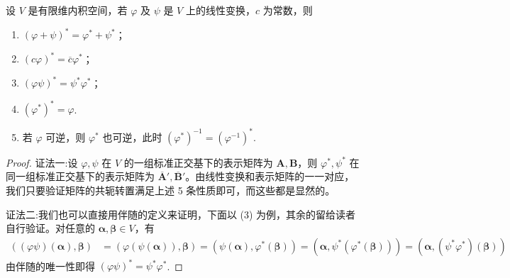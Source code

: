 \documentclass[../../main.tex]{subfiles}
\begin{document}
\begin{theorem}[伴随算子的性质]\label{theorem:伴随算子的性质}
设 $V$ 是有限维内积空间，若 $\varphi$ 及 $\psi$ 是 $V$ 上的线性变换，$c$ 为常数，则
\begin{enumerate}[(1)]
\item $(\varphi + \psi)^* = \varphi^* + \psi^*$；

\item $(c\varphi)^* = \overline{c}\varphi^*$；

\item $(\varphi\psi)^* = \psi^*\varphi^*$；

\item $(\varphi^*)^* = \varphi$.

\item 若 \(\varphi\) 可逆，则 \(\varphi^*\) 也可逆，此时 \((\varphi^*)^{-1}=(\varphi^{-1})^*\). 
\end{enumerate} 
\end{theorem}
\begin{proof}
{\color{blue}证法一:}设 $\varphi, \psi$ 在 $V$ 的一组标准正交基下的表示矩阵为 $\boldsymbol{A}, \boldsymbol{B}$，则 $\varphi^*, \psi^*$ 在同一组标准正交基下的表示矩阵为 $\overline{\boldsymbol{A}}', \overline{\boldsymbol{B}}'$。由线性变换和表示矩阵的一一对应，我们只要验证矩阵的共轭转置满足上述 5 条性质即可，而这些都是显然的。

{\color{blue}证法二:}我们也可以直接用伴随的定义来证明，下面以 (3) 为例，其余的留给读者自行验证。对任意的 $\boldsymbol{\alpha}, \boldsymbol{\beta} \in V$，有
\begin{align*}
((\varphi\psi)(\boldsymbol{\alpha}), \boldsymbol{\beta}) &= (\varphi(\psi(\boldsymbol{\alpha})), \boldsymbol{\beta}) = (\psi(\boldsymbol{\alpha}), \varphi^*(\boldsymbol{\beta})) = (\boldsymbol{\alpha}, \psi^*(\varphi^*(\boldsymbol{\beta}))) = (\boldsymbol{\alpha}, (\psi^*\varphi^*)(\boldsymbol{\beta}))
\end{align*}
由伴随的唯一性即得 $(\varphi\psi)^* = \psi^*\varphi^*$.

\end{proof}
\end{document}
